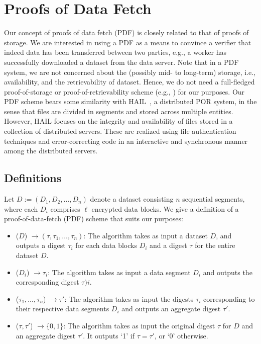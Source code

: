 \section{Proofs of Data Fetch} \label{sect:pdf}

Our concept of proofs of data fetch (PDF) is closely related to that of proofs of storage.
We are interested in using a PDF as a means to convince a verifier that indeed data has been transferred between two parties, e.g., a worker has successfully downloaded a dataset from the data server.
Note that in a PDF system, we are not concerned about the (possibly mid- to long-term) storage, i.e., availability, and the retrievability of dataset.
Hence, we do not need a full-fledged proof-of-storage or proof-of-retrievability scheme (e.g., \cite{JK07,AKK09,SW13}) for our purposes.
Our PDF scheme bears some similarity with HAIL~\cite{BJO09b}, a distributed POR system, in the sense that files are divided in segments and stored across multiple entities.
However, HAIL focuses on the integrity and availability of files stored in a collection of distributed servers.
These are realized using file authentication techniques and error-correcting code in an interactive and synchronous manner among the distributed servers.


\subsection{Definitions} \label{sect:pdf-definition}

Let $D := (D_1,D_2,\dotsc,D_n)$ denote a dataset consisting $n$ sequential segments, where each $D_i$ comprises $\ell$ encrypted data blocks.
We give a definition of a proof-of-data-fetch (PDF) scheme that suits our purposes:
\begin{itemize}
\item \Setup($D$) $\rightarrow (\tau,\tau_1,\dotsc,\tau_n)$: The algorithm takes as input a dataset $D$, and outputs a digest $\tau_i$ for each data blocks $D_i$ and a digest $\tau$ for the entire dataset $D$.

\item \Prove($D_i$) $\rightarrow \tau_i$: The algorithm takes as input a data segment $D_i$ and outputs the corresponding digest $\tau)i$.

\item \Aggregate($\tau_1,\dotsc,\tau_n$) $\rightarrow \tau'$: The algorithm takes as input the digests $\tau_i$ corresponding to their respective data segments $D_i$ and outputs an aggregate digest $\tau'$.

\item \Verify($\tau, \tau'$) $\rightarrow \{0,1\}$: The algorithm takes as input the original digest $\tau$ for $D$ and an aggregate digest $\tau'$. It outputs `1' if $\tau=\tau'$, or `0' otherwise.
\end{itemize}

